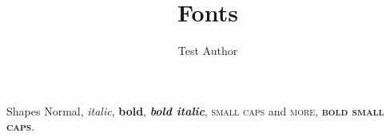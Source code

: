 \documentclass[aspectratio=169,10pt]{beamer}
\title{Fonts}
\author{Test Author}
\begin{document}
\begin{frame}{Shapes}
	Normal, \textit{italic}, \textbf{bold}, \textbf{\textit{bold italic}}, {\scshape small caps} and \textsc{more}, \textbf{\textsc{bold small caps}}.
\end{frame}
\end{document}
